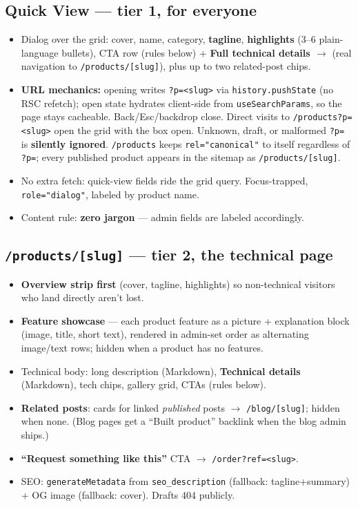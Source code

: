 \documentclass[11pt,a4paper]{article}
\begin{document}
\subsection{Quick View --- tier 1, for everyone}
\begin{itemize}
  \item Dialog over the grid: cover, name, category, \textbf{tagline}, \textbf{highlights}
        (3--6 plain-language bullets), CTA row (rules below) + \textbf{Full technical details
        $\rightarrow$} (real navigation to \texttt{/products/[slug]}), plus up to two
        related-post chips.
  \item \textbf{URL mechanics:} opening writes \texttt{?p=<slug>} via
        \texttt{history.pushState} (no RSC refetch); open state hydrates client-side from
        \texttt{useSearchParams}, so the page stays cacheable. Back/Esc/backdrop close.
        Direct visits to \texttt{/products?p=<slug>} open the grid with the box open.
        Unknown, draft, or malformed \texttt{?p=} is \textbf{silently ignored}.
        \texttt{/products} keeps \texttt{rel="canonical"} to itself regardless of
        \texttt{?p=}; every published product appears in the sitemap as
        \texttt{/products/[slug]}.
  \item No extra fetch: quick-view fields ride the grid query. Focus-trapped,
        \texttt{role="dialog"}, labeled by product name.
  \item Content rule: \textbf{zero jargon} --- admin fields are labeled accordingly.
\end{itemize}

\subsection{\texttt{/products/[slug]} --- tier 2, the technical page}
\begin{itemize}
  \item \textbf{Overview strip first} (cover, tagline, highlights) so non-technical
        visitors who land directly aren't lost.
  \item \textbf{Feature showcase} --- each product feature as a picture + explanation block
        (image, title, short text), rendered in admin-set order as alternating image/text
        rows; hidden when a product has no features.
  \item Technical body: long description (Markdown), \textbf{Technical details} (Markdown),
        tech chips, gallery grid, CTAs (rules below).
  \item \textbf{Related posts}: cards for linked \emph{published} posts $\rightarrow$
        \texttt{/blog/[slug]}; hidden when none. (Blog pages get a ``Built product'' backlink
        when the blog admin ships.)
  \item \textbf{``Request something like this''} CTA $\rightarrow$ \texttt{/order?ref=<slug>}.
  \item SEO: \texttt{generateMetadata} from \texttt{seo\_description} (fallback:
        tagline+summary) + OG image (fallback: cover). Drafts 404 publicly.
\end{itemize}
\end{document}
